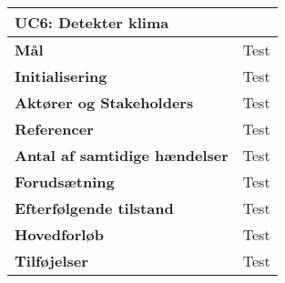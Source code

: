 \begin{table}[H] \centering
\begin{tabular}{|p{6cm}|p{8cm}|}
	\hline
\multicolumn{2}{|l|}{\textbf{UC6: Detekter klima}} \\\hline
\textbf{Mål}								&Test \\\hline
\textbf{Initialisering}					&Test \\\hline
\textbf{Aktører og Stakeholders}			&Test \\\hline
\textbf{Referencer}						&Test \\\hline
\textbf{Antal af samtidige hændelser}	&Test \\\hline
\textbf{Forudsætning}					&Test \\\hline
\textbf{Efterfølgende tilstand}			&Test \\\hline
\textbf{Hovedforløb}						&Test \\\hline
\textbf{Tilføjelser}						&Test \\\hline
	\end{tabular}
	\label{UC6} 
\end{table}